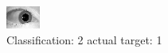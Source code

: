 \begin{figure}[h!]
\begin{center}
\includegraphics[width=0.60\columnwidth]{figures/ID1552_class_2_target_1.png}
\end{center}
\caption{ Classification: 2 actual target: 1}
\label{fig:ID1552_class_2_target_1}
\end{figure}
